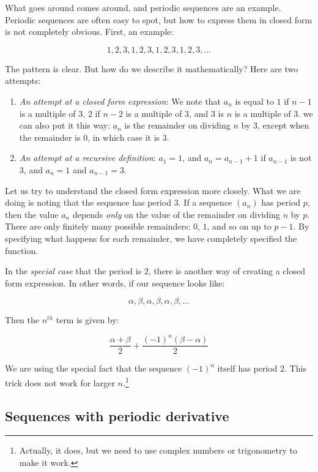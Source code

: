 \documentclass{amsart}
\begin{document}
What goes around comes around, and periodic sequences are an
example. Periodic sequences are often easy to spot, but how to express
them in closed form is not completely obvious. First, an example:

$$1,2,3,1,2,3,1,2,3,1,2,3,\dots$$

The pattern is clear. But how do we describe it mathematically? Here
are two attempts:

\begin{enumerate}
\item {\em An attempt at a closed form expression}: We note that $a_n$
  is equal to $1$ if $n - 1$ is a multiple of $3$, $2$ if $n - 2$ is a
  multiple of $3$, and $3$ is $n$ is a multiple of $3$. we can also
  put it this way: $a_n$ is the remainder on dividing $n$ by $3$,
  except when the remainder is $0$, in which case it is $3$.
\item {\em An attempt at a recursive definition}: $a_1 = 1$, and $a_n
  = a_{n-1} + 1$ if $a_{n-1}$ is not $3$, and $a_n = 1$ and $a_{n-1} =
  3$.
\end{enumerate}

Let us try to understand the closed form expression more closely. What
we are doing is noting that the sequence has period $3$. If a sequence
$(a_n)$ has period $p$, then the value $a_n$ depends {\em only} on the
value of the remainder on dividing $n$ by $p$. There are only finitely
many possible remainders: $0$, $1$, and so on up to $p - 1$. By
specifying what happens for each remainder, we have completely
specified the function.

In the {\em special case} that the period is $2$, there is another way
of creating a closed form expression. In other words, if our sequence looks like:

$$\alpha,\beta,\alpha,\beta,\alpha,\beta,\dots$$

Then the $n^{th}$ term is given by:

$$\frac{\alpha + \beta}{2} + \frac{(-1)^n(\beta - \alpha)}{2}$$

We are using the special fact that the sequence $(-1)^n$ itself has
period $2$. This trick does not work for larger
$n$.\footnote{Actually, it does, but we need to use complex numbers or
trigonometry to make it work.}

\subsection{Sequences with periodic derivative}
\end{document}
